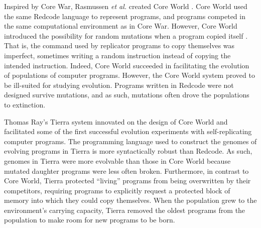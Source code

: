 Inspired by Core War, Rasmussen \textit{et al.} created Core World \citep{rasmussen_core_1989}.
Core World used the same Redcode language to represent programs, and programs competed in the same computational environment as in Core War.
However, Core World introduced the possibility for random mutations when a program copied itself \citep{rasmussen_core_1989,rasmussen_coreworld_1990}.
That is, the command used by replicator programs to copy themselves was imperfect, sometimes writing a random instruction instead of copying the intended instruction. 
Indeed, Core World succeeded in facilitating the evolution of populations of computer programs. 
However, the Core World system proved to be ill-suited for studying evolution.
Programs written in Redcode were not designed survive mutations, and as such, mutations often drove the populations to extinction.

Thomas Ray's Tierra system \citep{ray_approach_1991} innovated on the design of Core World and facilitated some of the first successful evolution experiments with self-replicating computer programs.
The programming language used to construct the genomes of evolving programs in Tierra is more syntactically robust than Redcode.
As such, genomes in Tierra were more evolvable than those in Core World because mutated daughter programs were less often broken. 
Furthermore, in contrast to Core World, Tierra protected ``living'' programs from being overwritten by their competitors, requiring programs to explicitly request a protected block of memory into which they could copy themselves. 
When the population grew to the environment's carrying capacity, Tierra removed the oldest programs from the population to make room for new programs to be born. 


